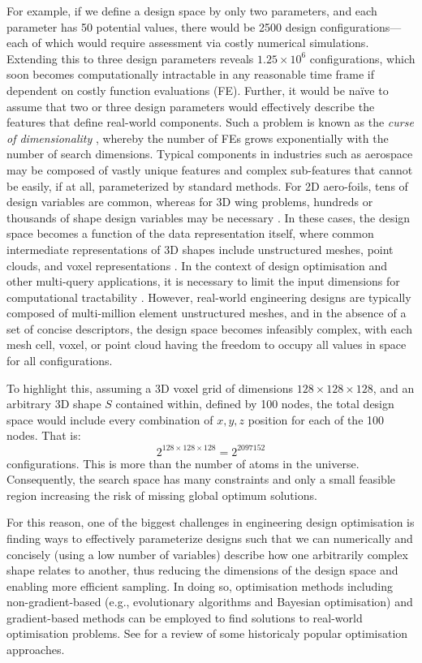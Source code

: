 \documentclass{article}
\begin{document}
For example, if we define a design space by only two parameters, and each parameter has 50 potential values, there would be 2500 design configurations—each of which would require assessment via costly numerical simulations. Extending this to three design parameters reveals $1.25 \times 10^6$
configurations, which soon becomes computationally intractable in any reasonable time frame if dependent on costly function evaluations (FE). Further, it would be naïve to assume that two or three design parameters would effectively describe the features that define real-world components. Such a problem is known as the \textit{curse of dimensionality} \citep{Keogh2017}, whereby the number of FEs grows exponentially with the number of search dimensions. Typical components in industries such as aerospace may be composed of vastly unique features and complex sub-features that cannot be easily, if at all, parameterized by standard methods. For 2D aero-foils, tens of design variables are common, whereas for 3D wing problems, hundreds or thousands of shape design variables may be necessary \citep{Jabn2024}. In these cases, the design space becomes a function of the data representation itself, where common intermediate representations of 3D shapes include unstructured meshes, point clouds, and voxel representations \citep{Jabn2024}. In the context of design optimisation and other multi-query applications, it is necessary to limit the input dimensions for computational tractability \citep{Jabn2024}. However, real-world engineering designs are typically composed of multi-million element unstructured meshes, and in the absence of a set of concise descriptors, the design space becomes infeasibly complex, with each mesh cell, voxel, or point cloud having the freedom to occupy all values in space for all configurations. 

To highlight this, assuming a 3D voxel grid of dimensions \( 128\times128\times128 \), and an arbitrary 3D shape \( S \) contained within, defined by 100 nodes, the total design space would include every combination of \( x,y,z \) position for each of the 100 nodes. That is:
\[
2^{128\times128\times128} =  2^{2097152}
\]
configurations. This is more than the number of atoms in the universe. Consequently, the search space has many constraints and only a small feasible region \citep{Shi2010} increasing the risk of missing global optimum solutions.

For this reason, one of the biggest challenges in engineering design optimisation is finding ways to effectively parameterize designs such that we can numerically and concisely (using a low number of variables) describe how one arbitrarily complex shape relates to another, thus reducing the dimensions of the design space and enabling more efficient sampling. In doing so, optimisation methods including non-gradient-based \citep{Hare2013} (e.g., evolutionary algorithms and Bayesian optimisation) and gradient-based methods can be employed to find solutions to real-world optimisation problems. See \citep{Roy2008} for a review of some historicaly popular optimisation approaches.
\end{document}
